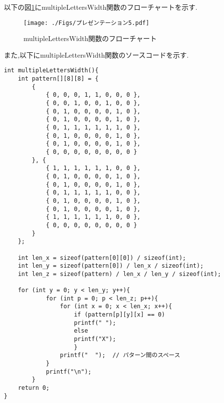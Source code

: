 \documentclass[uplatex,dvipdfmx]{jsarticle}
\begin{document}
以下の図\ref{fig:multipleLettersWidth関数のフローチャート}にmultipleLettersWidth関数のフローチャートを示す.
\begin{figure}[h]
    \centering
    \texttt{[image: ./Figs/プレゼンテーション5.pdf]}
    \caption{multipleLettersWidth関数のフローチャート}
    \label{fig:multipleLettersWidth関数のフローチャート}
\end{figure}

また,以下にmultipleLettersWidth関数のソースコードを示す.
\begin{lstlisting}[firstnumber = 1, caption=複数の文字を横に並べる, label=code]   
int multipleLettersWidth(){
    int pattern[][8][8] = {
        {
            { 0, 0, 0, 1, 1, 0, 0, 0 },
            { 0, 0, 1, 0, 0, 1, 0, 0 },
            { 0, 1, 0, 0, 0, 0, 1, 0 },
            { 0, 1, 0, 0, 0, 0, 1, 0 },
            { 0, 1, 1, 1, 1, 1, 1, 0 },
            { 0, 1, 0, 0, 0, 0, 1, 0 },
            { 0, 1, 0, 0, 0, 0, 1, 0 },
            { 0, 0, 0, 0, 0, 0, 0, 0 }
        }, {
            { 1, 1, 1, 1, 1, 1, 0, 0 },
            { 0, 1, 0, 0, 0, 0, 1, 0 },
            { 0, 1, 0, 0, 0, 0, 1, 0 },
            { 0, 1, 1, 1, 1, 1, 0, 0 },
            { 0, 1, 0, 0, 0, 0, 1, 0 },
            { 0, 1, 0, 0, 0, 0, 1, 0 },
            { 1, 1, 1, 1, 1, 1, 0, 0 },
            { 0, 0, 0, 0, 0, 0, 0, 0 }
        }
    };

    int len_x = sizeof(pattern[0][0]) / sizeof(int);
    int len_y = sizeof(pattern[0]) / len_x / sizeof(int);
    int len_z = sizeof(pattern) / len_x / len_y / sizeof(int);
    
    for (int y = 0; y < len_y; y++){
            for (int p = 0; p < len_z; p++){
                for (int x = 0; x < len_x; x++){
                    if (pattern[p][y][x] == 0)
                    printf(" ");
                    else
                    printf("X");
                    }
                printf("  ");  // パターン間のスペース
            }
            printf("\n");
        }
    return 0;
}
\end{lstlisting}
\end{document}
